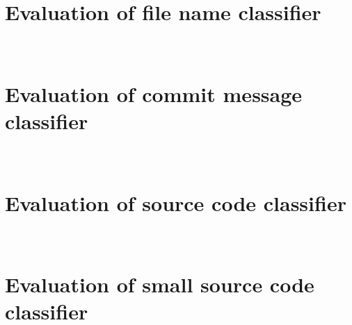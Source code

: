 \documentclass[%
a4paper,
DIV12,
2.5headlines,
bigheadings,
titlepage,
openbib,
]{scrartcl}
\begin{document}
\FloatBarrier

\FloatBarrier

\newpage
\section{\\Evaluation of file name classifier} \label{App:AppendixD}

\FloatBarrier

\FloatBarrier

\newpage
\section{\\Evaluation of commit message classifier} \label{App:AppendixE}

\FloatBarrier

\FloatBarrier

\newpage
\section{\\Evaluation of source code classifier} \label{App:AppendixF}

\FloatBarrier

\FloatBarrier

\newpage
\section{\\Evaluation of small source code classifier} \label{App:AppendixG}

\FloatBarrier

\FloatBarrier
\end{document}
